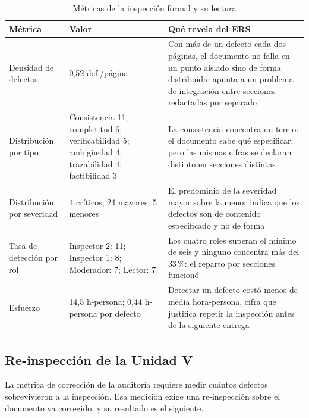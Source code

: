 \begin{table}[H]
\centering\footnotesize
\caption{Métricas de la inspección formal y su lectura}
\label{tab:met-inspeccion}
\begin{tabular}{|L{3.8cm}|L{3.6cm}|L{7.6cm}|}
\hline
{}\textbf{Métrica} & \textbf{Valor} & \textbf{Qué revela del ERS}\\ \hline
Densidad de defectos & 0,52 def./página & Con más de un defecto cada dos páginas, el documento no falla en un punto aislado sino de forma distribuida: apunta a un problema de integración entre secciones redactadas por separado\\ \hline
Distribución por tipo & Consistencia 11; completitud 6; verificabilidad 5; ambigüedad 4; trazabilidad 4; factibilidad 3 & La consistencia concentra un tercio: el documento sabe qué especificar, pero las mismas cifras se declaran distinto en secciones distintas\\ \hline
Distribución por severidad & 4 críticos; 24 mayores; 5 menores & El predominio de la severidad mayor sobre la menor indica que los defectos son de contenido especificado y no de forma\\ \hline
Tasa de detección por rol & Inspector 2: 11; Inspector 1: 8; Moderador: 7; Lector: 7 & Los cuatro roles superan el mínimo de seis y ninguno concentra más del 33\,\%: el reparto por secciones funcionó\\ \hline
Esfuerzo & 14,5 h-persona; 0,44 h-persona por defecto & Detectar un defecto costó menos de media hora-persona, cifra que justifica repetir la inspección antes de la siguiente entrega\\ \hline
\end{tabular}
\end{table}

\subsection{Re-inspección de la Unidad V}

La métrica de corrección de la auditoría requiere medir cuántos defectos sobrevivieron a la
inspección. Esa medición exige una re-inspección sobre el documento ya corregido, y su resultado es
el siguiente.

